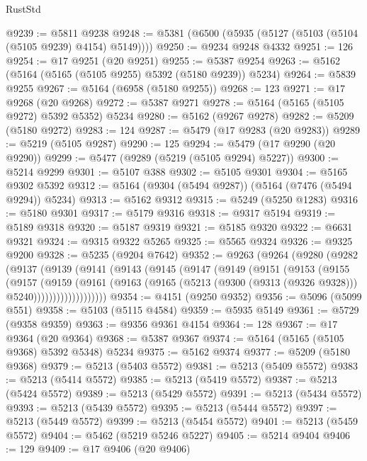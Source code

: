 \begin{lexlean}{RustStd}
\begin{coremodule}
@9239 := @5811 @9238
@9248 := @5381 (@6500 (@5935 (@5127 (@5103 (@5104 (@5105 @9239) @4154) @5149))))
@9250 := @9234 @9248 @4332
@9251 := 126
@9254 := @17 @9251 (@20 @9251)
@9255 := @5387 @9254
@9263 := @5162 (@5164 (@5165 (@5105 @9255) @5392 (@5180 @9239)) @5234)
@9264 := @5839 @9255
@9267 := @5164 (@6958 (@5180 @9255))
@9268 := 123
@9271 := @17 @9268 (@20 @9268)
@9272 := @5387 @9271
@9278 := @5164 (@5165 (@5105 @9272) @5392 @5352) @5234
@9280 := @5162 (@9267 @9278)
@9282 := @5209 (@5180 @9272)
@9283 := 124
@9287 := @5479 (@17 @9283 (@20 @9283))
@9289 := @5219 (@5105 @9287)
@9290 := 125
@9294 := @5479 (@17 @9290 (@20 @9290))
@9299 := @5477 (@9289 (@5219 (@5105 @9294) @5227))
@9300 := @5214 @9299
@9301 := @5107 @388
@9302 := @5105 @9301
@9304 := @5165 @9302 @5392
@9312 := @5164 (@9304 (@5494 @9287)) (@5164 (@7476 (@5494 @9294)) @5234)
@9313 := @5162 @9312
@9315 := @5249 (@5250 @1283)
@9316 := @5180 @9301
@9317 := @5179 @9316
@9318 := @9317 @5194
@9319 := @5189 @9318
@9320 := @5187 @9319
@9321 := @5185 @9320
@9322 := @6631 @9321
@9324 := @9315 @9322 @5265
@9325 := @5565 @9324
@9326 := @9325 @9200
@9328 := @5235 (@9204 @7642)
@9352 := @9263
    (@9264
      (@9280
        (@9282
          (@9137
            (@9139
              (@9141
                (@9143
                  (@9145
                    (@9147
                      (@9149
                        (@9151
                          (@9153
                            (@9155
                              (@9157
                                (@9159
                                  (@9161
                                    (@9163
                                      (@9165
                                        (@5213
                                          (@9300 (@9313 (@9326 @9328)))
                                          @5240)))))))))))))))))))
@9354 := @4151 (@9250 @9352)
@9356 := @5096 (@5099 @551)
@9358 := @5103 (@5115 @4584)
@9359 := @5935 @5149
@9361 := @5729 (@9358 @9359)
@9363 := @9356 @9361 @4154
@9364 := 128
@9367 := @17 @9364 (@20 @9364)
@9368 := @5387 @9367
@9374 := @5164 (@5165 (@5105 @9368) @5392 @5348) @5234
@9375 := @5162 @9374
@9377 := @5209 (@5180 @9368)
@9379 := @5213 (@5403 @5572)
@9381 := @5213 (@5409 @5572)
@9383 := @5213 (@5414 @5572)
@9385 := @5213 (@5419 @5572)
@9387 := @5213 (@5424 @5572)
@9389 := @5213 (@5429 @5572)
@9391 := @5213 (@5434 @5572)
@9393 := @5213 (@5439 @5572)
@9395 := @5213 (@5444 @5572)
@9397 := @5213 (@5449 @5572)
@9399 := @5213 (@5454 @5572)
@9401 := @5213 (@5459 @5572)
@9404 := @5462 (@5219 @5246 @5227)
@9405 := @5214 @9404
@9406 := 129
@9409 := @17 @9406 (@20 @9406)

\end{coremodule}
\end{lexlean}
